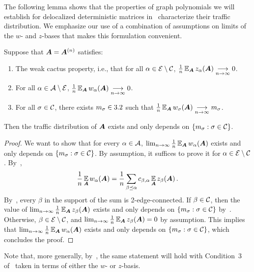 The following lemma shows that the properties
of graph polynomials
we will establish for delocalized deterministic matrices
in~ characterize their traffic distribution.
We emphasize our use of a combination of assumptions on limits of the $w$- and $z$-bases that makes this formulation convenient.

\begin{lemma}
    \label{lem:eqDiffMobius}
    Suppose that ${\bm A} = {\bm A}^{(n)}$ satisfies:
    \begin{enumerate}
        \item The weak cactus property, i.e., that for all $\alpha\in {\cal E}\setminus {\cal C}$, $\frac 1n \operatorname*{\mathbb{E}}_{{\bm A}} z_\alpha({\bm A})\underset{n\to\infty}{\longrightarrow} 0$.
        \item For all $\alpha\in {\cal A}\setminus {\cal E}$, $\frac 1n \operatorname*{\mathbb{E}}_{{\bm A}} w_\alpha({\bm A})\underset{n\to\infty}{\longrightarrow} 0$.
        \item For all $\sigma\in {\cal C}$,
        there exists $m_\sigma\in 3.2 $ such that
        $\frac 1n \operatorname*{\mathbb{E}}_{{\bm A}} w_\sigma({\bm A})\underset{n\to\infty}{\longrightarrow} m_\sigma$.
    \end{enumerate}
    Then the traffic distribution of ${\bm A}$
    exists
    and only depends on $\{m_\sigma : \sigma\in{\cal C}\}$.
\end{lemma}

\begin{proof}
    We want to show that for every $\alpha\in {\cal A}$, $ \lim_{n\to\infty} \frac 1n \operatorname*{\mathbb{E}}_{{\bm A}} w_\alpha({\bm A})$ exists and
    only depends on $\{m_\sigma : \sigma\in{\cal C}\}$. By assumption, it suffices to prove it for $\alpha\in {\cal E}\setminus {\cal C}$. By~,
    \[
        \frac 1n \operatorname*{\mathbb{E}}_{{\bm A}} w_\alpha({\bm A}) = \frac 1n \sum_{\beta\preceq \alpha} c_{\beta,\alpha} \operatorname*{\mathbb{E}}_{{\bm A}} z_\beta({\bm A})\,.
    \]
    By~, every $\beta$
    in the support of the sum is 2-edge-connected. If $\beta\in{\cal C}$, then the value of $\lim_{n\to\infty} \frac 1n  \operatorname*{\mathbb{E}}_{{\bm A}} z_\beta({\bm A})$ exists and only
    depends on $\{m_\sigma : \sigma\in{\cal C}\}$
    by~. Otherwise,
    $\beta\in{\cal E}\setminus {\cal C}$, and $\lim_{n\to\infty} \frac 1n  \operatorname*{\mathbb{E}}_{{\bm A}} z_\beta({\bm A}) = 0$ by assumption. This
    implies that $\lim_{n\to\infty}\frac 1n \operatorname*{\mathbb{E}}_{{\bm A}} w_\alpha({\bm A})$ exists and 
    only depends on $\{m_\sigma : \sigma\in{\cal C}\}$, which concludes the proof.
\end{proof}
\noindent
Note that, more generally, by~, the same statement will hold with Condition~3 of~ taken in terms of either the $w$- or $z$-basis.


